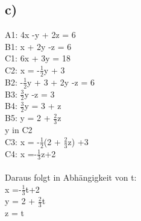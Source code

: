 \documentclass{article}
\begin{document}
	\subsection*{c)}
	A1: 4x -y + 2z = 6 \\
	B1: x + 2y -z = 6 \\
	C1: 6x + 3y = 18 \\
	C2: x = -$\frac{1}{2}$y + 3 \\
	B2: -$\frac{1}{2}$y + 3 + 2y -z = 6 \\
	B3: $\frac{3}{2}$y -z = 3 \\
	B4: $\frac{3}{2}$y = 3 + z \\
	B5: y = 2 + $\frac{2}{3}$z \\
	y in C2 \\
	C3: x = -$\frac{1}{2}$(2 + $\frac{2}{3}$z) +3 \\
	C4: x =-$\frac{1}{3}$z+2 \\ \\
	Daraus folgt in Abhängigkeit von t:  \\
	x =-$\frac{1}{3}$t+2 \\
	y = 2 + $\frac{2}{3}$t \\
	z = t
\end{document}
